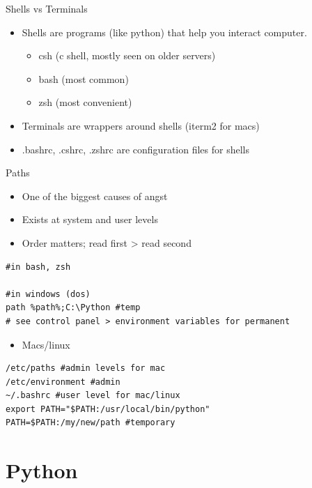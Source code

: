 \documentclass[presentation]{beamer}
\begin{document}
\begin{frame}[label=sec-3-0-9]{Shells vs Terminals}
\begin{itemize}
\item Shells are programs (like python) that help you interact computer.
\begin{itemize}
\item csh (c shell, mostly seen on older servers)
\item bash (most common)
\item zsh (most convenient)
\end{itemize}
\item Terminals are wrappers around shells (iterm2 for macs)
\item .bashrc, .cshrc, .zshrc are configuration files for shells
\end{itemize}
\end{frame}


\begin{frame}[fragile,label=sec-3-0-10]{Paths}
 \begin{itemize}
\item One of the biggest causes of angst
\item Exists at system and user levels
\item Order matters; read first > read second
\end{itemize}
\lstset{numbers=left,language=sh,label= ,caption= }
\begin{lstlisting}
#in bash, zsh 

#in windows (dos)
path %path%;C:\Python #temp
# see control panel > environment variables for permanent
\end{lstlisting}
\begin{itemize}
\item Macs/linux
\end{itemize}
\lstset{numbers=left,language=sh,label= ,caption= }
\begin{lstlisting}
/etc/paths #admin levels for mac
/etc/environment #admin
~/.bashrc #user level for mac/linux
export PATH="$PATH:/usr/local/bin/python"
PATH=$PATH:/my/new/path #temporary
\end{lstlisting}
\end{frame}


\section{Python}
\label{sec-4}
\end{document}
